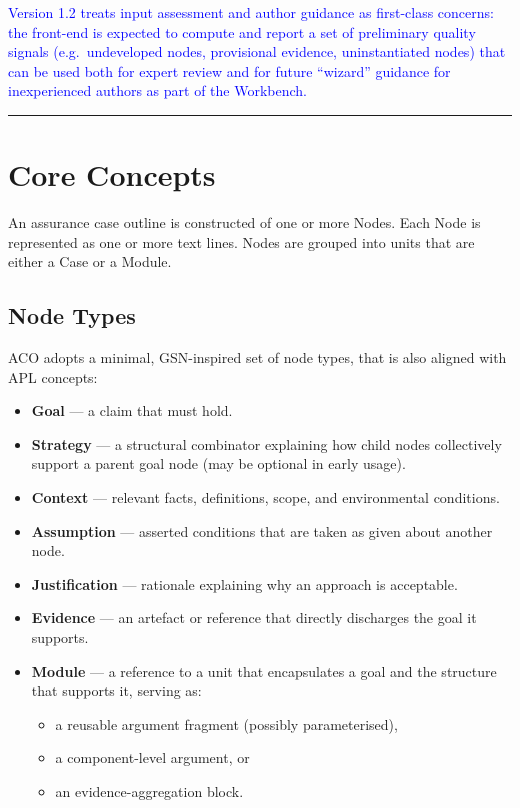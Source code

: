 \documentclass[11pt,twoside,a4paper]{article}
\begin{document}
\textcolor{blue}{Version 1.2 treats input assessment and author guidance as first-class concerns: the front-end is expected to compute and report a set of preliminary quality signals (e.g.\ undeveloped nodes, provisional evidence, uninstantiated nodes) that can be used both for expert review and for future ``wizard'' guidance for inexperienced authors as part of the Workbench.}

\bigskip
\hrule
\bigskip

\section{Core Concepts}
An assurance case outline is constructed of one or more Nodes.
Each Node is represented as one or more text lines.
Nodes are grouped into units that are either a Case or a Module.

\subsection{Node Types}

ACO adopts a minimal, GSN-inspired set of node types, that is also aligned with APL concepts:

\begin{itemize}[leftmargin=2em]
  \item \textbf{Goal} --- a claim that must hold.
  \item \textbf{Strategy} --- a structural combinator explaining how child nodes collectively
        support a parent goal node (may be optional in early usage).
  \item \textbf{Context} --- relevant facts, definitions, scope, and environmental conditions.
  \item \textbf{Assumption} --- asserted conditions that are taken as given about another node.
  \item \textbf{Justification} --- rationale explaining why an approach is acceptable.
  \item \textbf{Evidence} --- an artefact or reference that directly discharges the goal it
        supports.
  \item \textbf{Module} --- a reference to a unit that encapsulates a goal and the
        structure that supports it, serving as:
  \begin{itemize}[leftmargin=1.5em]
    \item a reusable argument fragment (possibly parameterised),
    \item a component-level argument, or
    \item an evidence-aggregation block.
  \end{itemize}
\end{itemize}
\end{document}
